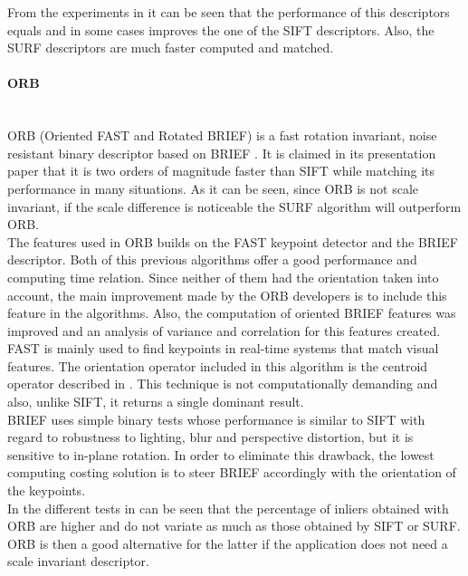 From the experiments in \cite{surf} it can be seen that the performance of this descriptors equals and in some cases improves the one of the SIFT descriptors. Also, the SURF descriptors are much faster computed and matched. 


\paragraph{ORB}\mbox{}\\

ORB (Oriented FAST and Rotated BRIEF) is a fast rotation invariant, noise resistant binary descriptor based on BRIEF \cite{orb}.
It is claimed in its presentation paper that it is two orders of magnitude faster than SIFT while matching its performance in many situations. As it can be seen, since ORB is not scale invariant, if the scale difference is noticeable the SURF algorithm will outperform ORB. 
\\

The features used in ORB builds on the FAST\cite{fast} keypoint detector and the BRIEF\cite{brief} descriptor. Both of this previous algorithms offer a good performance and computing time relation. Since neither of them had the orientation taken into account, the main improvement made by the ORB developers is to include this feature in the algorithms. Also, the computation of oriented BRIEF features was improved and an analysis of variance and correlation for this features created. 
\\

FAST is mainly used to find keypoints in real-time systems that match visual features. The orientation operator included in this algorithm is the centroid operator described in \cite{orientation_corners}. This technique is not computationally demanding and also, unlike SIFT, it returns a single dominant result. 
\\

BRIEF uses simple binary tests whose performance is similar to SIFT with regard to robustness to lighting, blur and perspective distortion, but it is sensitive to in-plane rotation. In order to eliminate this drawback, the lowest computing costing solution is to steer BRIEF accordingly with the orientation of the keypoints. 
\\

In the different tests in \cite{orb} can be seen that the percentage of inliers obtained with ORB are higher and do not variate as much as those obtained by SIFT or SURF. 
ORB is then a good alternative for the latter if the application does not need a scale invariant descriptor. 
\\

